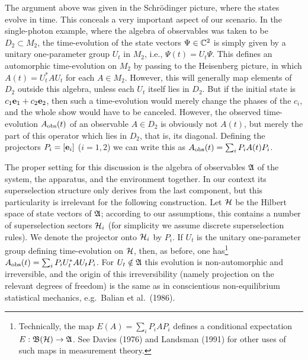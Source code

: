 \documentclass[12pt,titlepage]{article}
\newcommand{\raw}{\rightarrow}
\newcommand{\A}{\frak A}
\newcommand{\B}{\frak B}
\renewcommand{\H}{\mbox{$\cal H$}}
\newcommand{\fn}{\footnote}
\begin{document}
 The argument above was given in the Schr\"{o}dinger picture, where the states
evolve in time.
This conceals a very important aspect of our scenario.  In the single-photon
example, where the
algebra of observables was taken to be $D_2\subset M_2$, the time-evolution of
the state vectors
$\Psi\in {\Bbb C}^2$ is simply given by a unitary one-parameter group $U_t$ in
$M_2$, i.e.,
$\Psi(t)=U_t\Psi$. This defines an automorphic time-evolution on $M_2$ by
passing to the Heisenberg
picture, in which $A(t)=U_t^* AU_t$ for each  $A\in M_2$. However, this will
generally map elements of
$D_2$ outside this algebra, unless each $U_t$ itself lies in $D_2$. But  if
 the initial state is $c_1 {\bf e}_1 + c_2 {\bf e}_2$, then such a
time-evolution would merely change
the phases of the $c_i$, and the whole show would have to be canceled. However,
the observed
time-evolution $A_{\rm obs}(t)$ of an observable $A\in D_2$ is obviously not
$A(t)$, but merely the
part of this operator which lies in $D_2$, that is, its diagonal. Defining the
projectors
$P_i=[{\bf e}_i]$ ($i=1,2$) we can write this as  $A_{\rm obs}(t)=\sum_i P_i
A(t)P_i$.

The proper setting for this discussion is the algebra of observables $\A$ of
the system, the
apparatus, and the environment together. In our context its superselection
structure only derives from
the last component, but this particularity is irrelevant for the following
construction.
Let $\H$ be the Hilbert space of state vectors of $\A$; according to our
assumptions, this contains
a number of superselection sectors $\H_i$ (for simplicity we assume discrete
superselection rules).
We   denote the projector onto $\H_i$ by $P_i$.
If $U_t$ is the unitary one-parameter group defining time-evolution on $\H$,
then, as before, one
has\fn{Technically, the map $E(A)= \sum_i P_i  AP_i$  defines a conditional
expectation
$E:\B(\H)\raw \A$. See Davies (1976) and Landsman (1991) for other uses of such
maps in measurement
theory.}
 $A_{\rm
obs}(t)=\sum_i P_i U_t^* AU_t P_i$. For $U_t\notin \A$ this evolution is
non-automorphic and
irreversible, and the origin of this irreversibility (namely projection on the
relevant degrees of
freedom) is the same as in conscientious non-equilibrium statistical mechanics,
 e.g.\ Balian et al.\ (1986).
\end{document}
